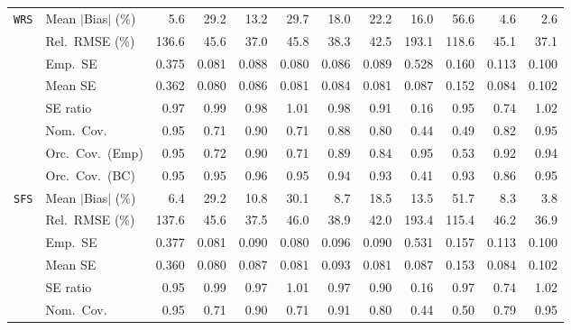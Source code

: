 \begin{landscape}
\begin{longtable}{llrrrrrrrrrr}
\addlinespace[2pt]
\quad \texttt{WRS} & Mean $|$Bias$|$ (\%) & \cellcolor{rankthree}5.6 & 29.2 & 13.2 & 29.7 & 18.0 & 22.2 & 16.0 & 56.6 & \cellcolor{ranktwo}4.6 & \cellcolor{rankone}2.6 \\
 & Rel.\ RMSE (\%) & 136.6 & 45.6 & \cellcolor{rankone}37.0 & 45.8 & \cellcolor{rankthree}38.3 & 42.5 & 193.1 & 118.6 & 45.1 & \cellcolor{ranktwo}37.1 \\
 & Emp.\ SE & 0.375 & 0.081 & 0.088 & 0.080 & 0.086 & 0.089 & 0.528 & 0.160 & 0.113 & 0.100 \\
 & Mean SE & 0.362 & 0.080 & 0.086 & 0.081 & 0.084 & 0.081 & 0.087 & 0.152 & 0.084 & 0.102 \\
 & SE ratio & \cellcolor{rankthree}0.97 & \cellcolor{rankone}0.99 & \cellcolor{ranktwo}0.98 & \cellcolor{rankone}1.01 & \cellcolor{ranktwo}0.98 & 0.91 & 0.16 & 0.95 & 0.74 & \cellcolor{ranktwo}1.02 \\
 & Nom.\ Cov. & \cellcolor{rankone}0.95 & 0.71 & \cellcolor{ranktwo}0.90 & 0.71 & \cellcolor{rankthree}0.88 & 0.80 & 0.44 & 0.49 & 0.82 & \cellcolor{rankone}0.95 \\
 & Orc.\ Cov.\ (Emp) & \cellcolor{rankone}0.95 & 0.72 & 0.90 & 0.71 & 0.89 & 0.84 & \cellcolor{rankone}0.95 & 0.53 & \cellcolor{rankthree}0.92 & \cellcolor{ranktwo}0.94 \\
 & Orc.\ Cov.\ (BC) & \cellcolor{rankone}0.95 & \cellcolor{rankone}0.95 & \cellcolor{ranktwo}0.96 & \cellcolor{rankone}0.95 & \cellcolor{ranktwo}0.94 & \cellcolor{rankthree}0.93 & 0.41 & \cellcolor{rankthree}0.93 & 0.86 & \cellcolor{rankone}0.95 \\
\addlinespace[2pt]
\quad \texttt{SFS} & Mean $|$Bias$|$ (\%) & \cellcolor{ranktwo}6.4 & 29.2 & 10.8 & 30.1 & 8.7 & 18.5 & 13.5 & 51.7 & \cellcolor{rankthree}8.3 & \cellcolor{rankone}3.8 \\
 & Rel.\ RMSE (\%) & 137.6 & 45.6 & \cellcolor{ranktwo}37.5 & 46.0 & \cellcolor{rankthree}38.9 & 42.0 & 193.4 & 115.4 & 46.2 & \cellcolor{rankone}36.9 \\
 & Emp.\ SE & 0.377 & 0.081 & 0.090 & 0.080 & 0.096 & 0.090 & 0.531 & 0.157 & 0.113 & 0.100 \\
 & Mean SE & 0.360 & 0.080 & 0.087 & 0.081 & 0.093 & 0.081 & 0.087 & 0.153 & 0.084 & 0.102 \\
 & SE ratio & 0.95 & \cellcolor{rankone}0.99 & \cellcolor{rankthree}0.97 & \cellcolor{rankone}1.01 & \cellcolor{rankthree}0.97 & 0.90 & 0.16 & \cellcolor{rankthree}0.97 & 0.74 & \cellcolor{ranktwo}1.02 \\
 & Nom.\ Cov. & \cellcolor{rankone}0.95 & 0.71 & \cellcolor{rankthree}0.90 & 0.71 & \cellcolor{ranktwo}0.91 & 0.80 & 0.44 & 0.50 & 0.79 & \cellcolor{rankone}0.95 \\

\end{longtable}
\end{landscape}
